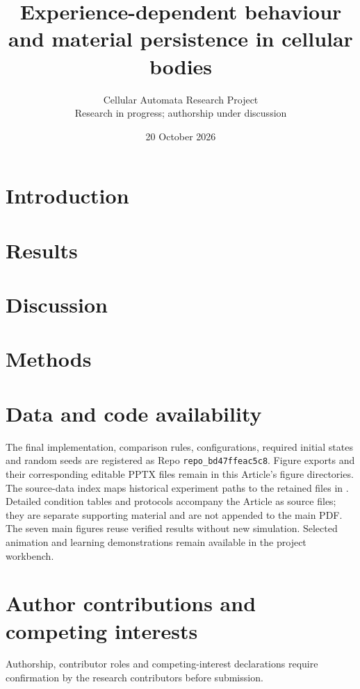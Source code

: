 \documentclass[11pt,a4paper]{article}
\title{Experience-dependent behaviour and material persistence in cellular bodies}
\author{Cellular Automata Research Project\\Research in progress; authorship under discussion}
\date{20 October 2026}
\begin{document}
\maketitle
\begin{abstract}

\end{abstract}
\section*{Introduction}

\section*{Results}

\section*{Discussion}

\section*{Methods}

\section*{Data and code availability}
The final implementation, comparison rules, configurations, required initial states and random seeds are registered as Repo \texttt{repo\_bd47ffeac5c8}. Figure exports and their corresponding editable PPTX files remain in this Article's figure directories. The source-data index  maps historical experiment paths to the retained files in . Detailed condition tables and protocols accompany the Article as source files; they are separate supporting material and are not appended to the main PDF. The seven main figures reuse verified results without new simulation. Selected animation and learning demonstrations remain available in the project workbench.
\section*{Author contributions and competing interests}
Authorship, contributor roles and competing-interest declarations require confirmation by the research contributors before submission.
\let\sharedbibliographyend\endthebibliography
\renewcommand{\endthebibliography}{%
%
\sharedbibliographyend}

\end{document}

